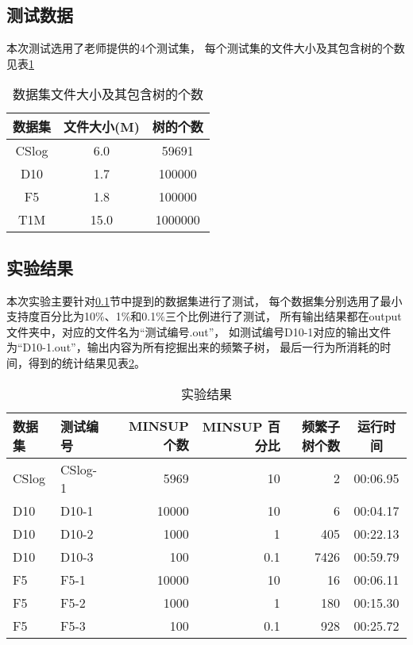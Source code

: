 \documentclass{ctexart}
\begin{document}
\subsection{测试数据}
\label{subsec-test-data}

本次测试选用了老师提供的4个测试集，
每个测试集的文件大小及其包含树的个数见表\ref{tab-test-data}

\begin{table}[!h]
    \centering
    \caption{数据集文件大小及其包含树的个数}
    \label{tab-test-data}
    \begin{tabular}{c|c|c}
        \hline
        数据集  & 文件大小(M) & 树的个数 \\ \hline
        CSlog   &  6.0        &   59691 \\ \hline
        D10     &  1.7        &  100000 \\ \hline
        F5      &  1.8        &  100000 \\ \hline
        T1M     & 15.0        & 1000000 \\ \hline
    \end{tabular}
\end{table}

\subsection{实验结果}
\label{subsec-result}

本次实验主要针对\ref{subsec-test-data}节中提到的数据集进行了测试，
每个数据集分别选用了最小支持度百分比为10\%、1\%和0.1\%三个比例进行了测试，
所有输出结果都在output文件夹中，对应的文件名为“测试编号.out”，
如测试编号D10-1对应的输出文件为“D10-1.out”，输出内容为所有挖掘出来的频繁子树，
最后一行为所消耗的时间，得到的统计结果见表\ref{tab-result}。

\begin{table}[h!]
    \centering
    \caption{实验结果}
    \label{tab-result}
    \begin{tabular}[h!]{l|l|r|r|r|c}
        \hline
        数据集 & 测试编号 & MINSUP 个数 & MINSUP 百分比 & 频繁子树个数 & 运行时间 \\ \hline
        CSlog & CSlog-1 & 5969 & 10 & 2 & 00:06.95 \\ \hline
        D10 & D10-1 & 10000 & 10 & 6 & 00:04.17 \\ \hline
        D10 & D10-2 & 1000 & 1 & 405 & 00:22.13 \\ \hline
        D10 & D10-3 & 100 & 0.1 & 7426 & 00:59.79 \\ \hline
        F5 & F5-1 & 10000 & 10 & 16 & 00:06.11 \\ \hline
        F5 & F5-2 & 1000 & 1 & 180 & 00:15.30 \\ \hline
        F5 & F5-3 & 100 & 0.1 & 928 & 00:25.72 \\ \hline
    \end{tabular}
\end{table}
\end{document}
